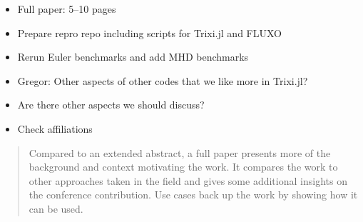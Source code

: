 \documentclass{juliacon}
\newcommand{\trixi}{Trixi.jl\xspace}
\newcommand{\todo}[1]{{\color{red}#1}}
\begin{document}



\todo{ %
\begin{itemize}
  \item Full paper: 5--10 pages
  \item Prepare repro repo including scripts for \trixi and FLUXO
  \item Rerun Euler benchmarks and add MHD benchmarks
  \item Gregor: Other aspects of other codes that we like more in \trixi?
  \item Are there other aspects we should discuss?
  \item Check affiliations
\end{itemize}
\begin{quote}
  Compared to an extended abstract, a full paper presents more of the background
  and context motivating the work. It compares the work to other approaches taken
  in the field and gives some additional insights on the conference contribution.
  Use cases back up the work by showing how it can be used.
\end{quote}}
\end{document}
